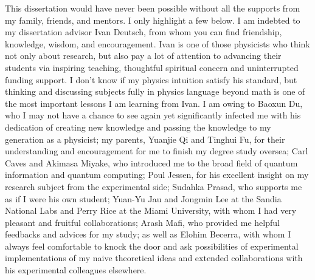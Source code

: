 \begin{acknowledgments}
\noindent This dissertation would have never been possible without all the supports from my family, friends, and mentors. I only highlight a few below. 
I am indebted to my dissertation advisor Ivan Deutsch, from whom you can find friendship, knowledge, wisdom, and encouragement.  Ivan is one of those physicists who think not only about research, but also pay a lot of attention to advancing their students via inspiring teaching, thoughtful spiritual concern and uninterrupted funding support. I don't know if my physics intuition satisfy his standard, but thinking and discussing subjects fully in physics language beyond math is one of the most important lessons I am learning from Ivan. 
I am owing to Baoxun Du, who I may not have a chance to see again yet significantly infected me with his dedication of creating new knowledge and passing the knowledge to my generation as a physicist; my parents, Yuanjie Qi and Tinghui Fu, for their understanding and encouragement for me to finish my degree study oversea; Carl Caves and Akimasa Miyake, who introduced me to the broad field of quantum information and quantum computing; Poul Jessen, for his excellent insight on my research subject from the experimental side; Sudahka Prasad, who supports me as if I were his own student; Yuan-Yu Jau and Jongmin Lee at the Sandia National Labs and Perry Rice at the Miami University, with whom I had very pleasant and fruitful collaborations; Arash Mafi, who provided me helpful feedbacks and advices for my study; as well as Elohim Becerra, with whom I always feel comfortable to knock the door and ask possibilities of experimental implementations of my naive theoretical ideas and extended collaborations with his experimental colleagues elsewhere.


\end{acknowledgments}
